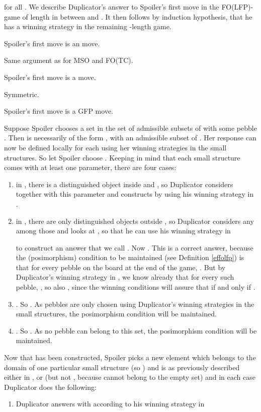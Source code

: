 \documentclass{LMCS}
\newcommand{\mso}{\textsf{MSO}\xspace}
\newcommand{\fotc}{\textsf{FO(TC)}\xspace}
\newcommand{\folfp}{\textsf{FO(LFP)}\xspace}
\begin{document}
for all . We describe Duplicator's answer to
Spoiler's first move in the \folfp-game of length  in between  and . It then follows by induction
hypothesis, that he has a winning strategy in the remaining
-length game.
\begin{iteMize}{}
\item   Spoiler's first move is an  move.

Same argument as for \mso and \fotc.
\item   Spoiler's first move is a  move.

Symmetric.
\item   Spoiler's first move is a GFP move.

Suppose Spoiler chooses a set  in the set of admissible subsets
of  with some pebble
. Then  is necessarily of the form , with  an admissible subset of . Her
response  can now be defined locally
for each  using her winning strategies in the small structures.
So let Spoiler choose . Keeping in
mind that each small structure comes with at least one parameter,
there are four cases:
\begin{enumerate}[1)]
\item     in , there is a distinguished object inside  and ,
so Duplicator considers  together with this parameter and
constructs  by using his winning strategy in
.
\item  in , there are only distinguished objects
outside , so Duplicator considers
any  among those and looks at
, so that he can use his winning strategy in

to construct an answer that we call . Now
. This is a correct answer, because
the (posimorphism) condition to be maintained (see Definition \ref{effolfp}) is that for every
pebble  on the board at the end of the game, . But by Duplicator's winning strategy in
, we
know already that for every such pebble, , so also , since the winning conditions will
  assure that  if and only if .
\item  . So
. As pebbles are only chosen using Duplicator's
winning strategies in the small structures, the posimorphism condition
will be maintained.
\item     . So . As no pebble can belong to this set, the
posimorphism condition will be maintained.
\end{enumerate}
Now that  has been constructed,
Spoiler picks a new element  which belongs to the domain
of one particular small structure  (so ) and
 is as previously described either in ,  or
 (but not , because  cannot belong to the empty set)
and in each case Duplicator does the following:
\begin{enumerate}[1)] 
\item    Duplicator answers with  according to his
winning strategy in


\end{enumerate}
\end{iteMize}
\end{document}

